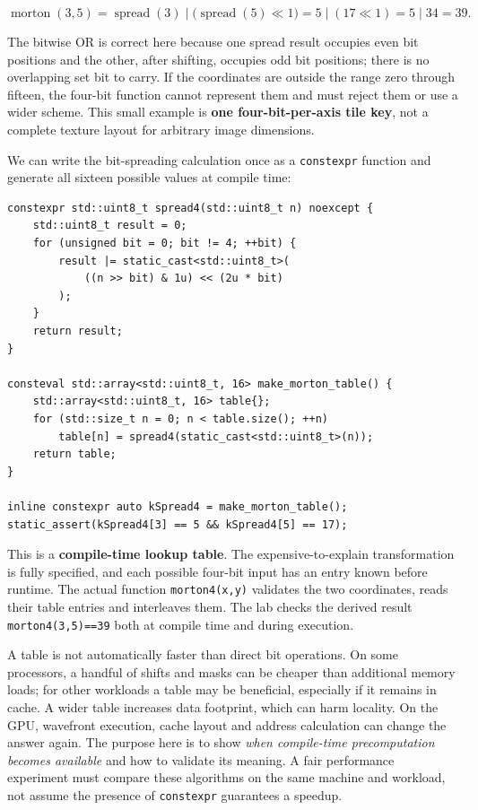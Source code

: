 \[
\operatorname{morton}(3,5)
=\operatorname{spread}(3)\;|\;
\big(\operatorname{spread}(5)\ll 1\big)
=5\;|\;(17\ll1)
=5\;|\;34
=39.
\]

The bitwise OR is correct here because one spread result occupies even bit positions and the other, after shifting, occupies odd bit positions; there is no overlapping set bit to carry. If the coordinates are outside the range zero through fifteen, the four-bit function cannot represent them and must reject them or use a wider scheme. This small example is \textbf{one four-bit-per-axis tile key}, not a complete texture layout for arbitrary image dimensions.

We can write the bit-spreading calculation once as a \texttt{constexpr} function and generate all sixteen possible values at compile time:

\begin{verbatim}
constexpr std::uint8_t spread4(std::uint8_t n) noexcept {
    std::uint8_t result = 0;
    for (unsigned bit = 0; bit != 4; ++bit) {
        result |= static_cast<std::uint8_t>(
            ((n >> bit) & 1u) << (2u * bit)
        );
    }
    return result;
}

consteval std::array<std::uint8_t, 16> make_morton_table() {
    std::array<std::uint8_t, 16> table{};
    for (std::size_t n = 0; n < table.size(); ++n)
        table[n] = spread4(static_cast<std::uint8_t>(n));
    return table;
}

inline constexpr auto kSpread4 = make_morton_table();
static_assert(kSpread4[3] == 5 && kSpread4[5] == 17);
\end{verbatim}

This is a \textbf{compile-time lookup table}. The expensive-to-explain transformation is fully specified, and each possible four-bit input has an entry known before runtime. The actual function \texttt{morton4(x,y)} validates the two coordinates, reads their table entries and interleaves them. The lab checks the derived result \texttt{morton4(3,5)==39} both at compile time and during execution.

A table is not automatically faster than direct bit operations. On some processors, a handful of shifts and masks can be cheaper than additional memory loads; for other workloads a table may be beneficial, especially if it remains in cache. A wider table increases data footprint, which can harm locality. On the GPU, wavefront execution, cache layout and address calculation can change the answer again. The purpose here is to show \emph{when compile-time precomputation becomes available} and how to validate its meaning. A fair performance experiment must compare these algorithms on the same machine and workload, not assume the presence of \texttt{constexpr} guarantees a speedup.

